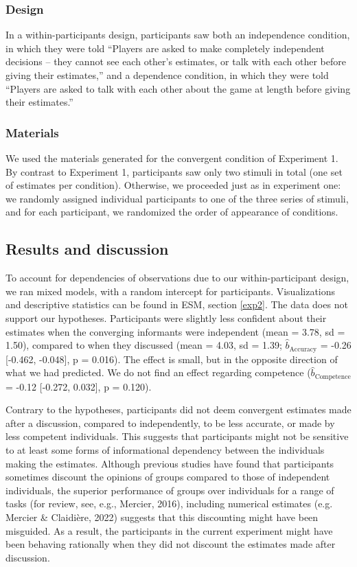 \documentclass[
  doc,floatsintext]{apa6}
\begin{document}
\subsubsection{Design}\label{design-1}

In a within-participants design, participants saw both an independence condition, in which they were told ``Players are asked to make completely independent decisions -- they cannot see each other's estimates, or talk with each other before giving their estimates,'' and a dependence condition, in which they were told ``Players are asked to talk with each other about the game at length before giving their estimates.''

\subsubsection{Materials}\label{materials-1}

We used the materials generated for the convergent condition of Experiment 1. By contrast to Experiment 1, participants saw only two stimuli in total (one set of estimates per condition). Otherwise, we proceeded just as in experiment one: we randomly assigned individual participants to one of the three series of stimuli, and for each participant, we randomized the order of appearance of conditions.

\subsection{Results and discussion}\label{results-and-discussion-1}

To account for dependencies of observations due to our within-participant design, we ran mixed models, with a random intercept for participants. Visualizations and descriptive statistics can be found in ESM, section \ref{exp2}. The data does not support our hypotheses. Participants were slightly less confident about their estimates when the converging informants were independent (mean = 3.78, sd = 1.50), compared to when they discussed (mean = 4.03, sd = 1.39; \(\hat{b}_{\text{Accuracy}}\) = -0.26 {[}-0.462, -0.048{]}, p = 0.016). The effect is small, but in the opposite direction of what we had predicted. We do not find an effect regarding competence (\(\hat{b}_{\text{Competence}}\) = -0.12 {[}-0.272, 0.032{]}, p = 0.120).

Contrary to the hypotheses, participants did not deem convergent estimates made after a discussion, compared to independently, to be less accurate, or made by less competent individuals. This suggests that participants might not be sensitive to at least some forms of informational dependency between the individuals making the estimates. Although previous studies have found that participants sometimes discount the opinions of groups compared to those of independent individuals, the superior performance of groups over individuals for a range of tasks (for review, see, e.g., Mercier, 2016), including numerical estimates (e.g. Mercier \& Claidière, 2022) suggests that this discounting might have been misguided. As a result, the participants in the current experiment might have been behaving rationally when they did not discount the estimates made after discussion.
\end{document}
